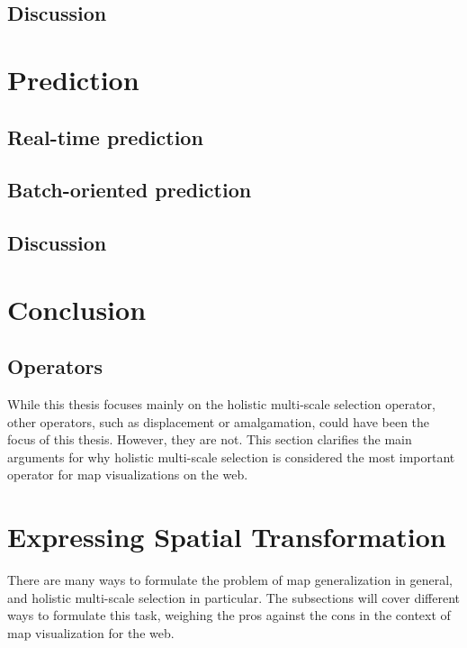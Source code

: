 \documentclass[11pt, oneside]{report}
\begin{document}
{\subsection{Discussion}

\section{Prediction}

\subsection{Real-time prediction}

\subsection{Batch-oriented prediction}

\subsection{Discussion}

\section{Conclusion}







\subsection{Operators}
\label{state:of:the:art:map:generalization:operators}

While this thesis focuses mainly on the holistic multi-scale selection operator, other operators, such as displacement or amalgamation, could have been the focus of this thesis. However, they are not. This section clarifies the main arguments for why holistic multi-scale selection is considered the most important operator for map visualizations on the web.


\section{Expressing Spatial Transformation}
\label{state:of:the:art:programming:multiscale:selection}



There are many ways to formulate the problem of map generalization in general, and holistic multi-scale selection in particular. The subsections will cover different ways to formulate this task, weighing the pros against the cons in the context of map visualization for the web.

}
\end{document}

